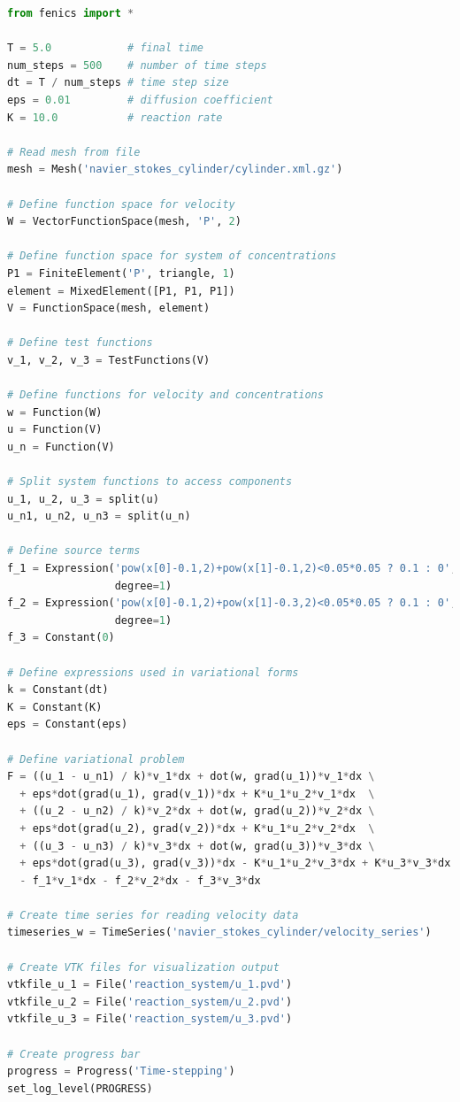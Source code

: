 \documentclass[graybox,envcountchap,sectrefs,final]{svmonodo}
\begin{document}
\begin{lstlisting}[language=Python,style=graycolor]
from fenics import *

T = 5.0            # final time
num_steps = 500    # number of time steps
dt = T / num_steps # time step size
eps = 0.01         # diffusion coefficient
K = 10.0           # reaction rate

# Read mesh from file
mesh = Mesh('navier_stokes_cylinder/cylinder.xml.gz')

# Define function space for velocity
W = VectorFunctionSpace(mesh, 'P', 2)

# Define function space for system of concentrations
P1 = FiniteElement('P', triangle, 1)
element = MixedElement([P1, P1, P1])
V = FunctionSpace(mesh, element)

# Define test functions
v_1, v_2, v_3 = TestFunctions(V)

# Define functions for velocity and concentrations
w = Function(W)
u = Function(V)
u_n = Function(V)

# Split system functions to access components
u_1, u_2, u_3 = split(u)
u_n1, u_n2, u_n3 = split(u_n)

# Define source terms
f_1 = Expression('pow(x[0]-0.1,2)+pow(x[1]-0.1,2)<0.05*0.05 ? 0.1 : 0',
                 degree=1)
f_2 = Expression('pow(x[0]-0.1,2)+pow(x[1]-0.3,2)<0.05*0.05 ? 0.1 : 0',
                 degree=1)
f_3 = Constant(0)

# Define expressions used in variational forms
k = Constant(dt)
K = Constant(K)
eps = Constant(eps)

# Define variational problem
F = ((u_1 - u_n1) / k)*v_1*dx + dot(w, grad(u_1))*v_1*dx \
  + eps*dot(grad(u_1), grad(v_1))*dx + K*u_1*u_2*v_1*dx  \
  + ((u_2 - u_n2) / k)*v_2*dx + dot(w, grad(u_2))*v_2*dx \
  + eps*dot(grad(u_2), grad(v_2))*dx + K*u_1*u_2*v_2*dx  \
  + ((u_3 - u_n3) / k)*v_3*dx + dot(w, grad(u_3))*v_3*dx \
  + eps*dot(grad(u_3), grad(v_3))*dx - K*u_1*u_2*v_3*dx + K*u_3*v_3*dx \
  - f_1*v_1*dx - f_2*v_2*dx - f_3*v_3*dx

# Create time series for reading velocity data
timeseries_w = TimeSeries('navier_stokes_cylinder/velocity_series')

# Create VTK files for visualization output
vtkfile_u_1 = File('reaction_system/u_1.pvd')
vtkfile_u_2 = File('reaction_system/u_2.pvd')
vtkfile_u_3 = File('reaction_system/u_3.pvd')

# Create progress bar
progress = Progress('Time-stepping')
set_log_level(PROGRESS)


\end{lstlisting}
\end{document}
